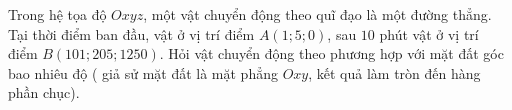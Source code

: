 \begin{ex}%
	Trong hệ tọa độ $Oxyz$, một vật chuyển động theo quĩ đạo là một đường thẳng. Tại thời điểm ban đầu, vật ở vị trí điểm $A(1;5;0)$, sau $10$ phút vật ở vị trí điểm $B(101;205;1250)$. Hỏi vật chuyển động theo phương hợp với mặt đất góc bao nhiêu độ ( giả sử mặt đất là mặt phẳng $Oxy$, kết quả làm tròn đến hàng phần chục).\\
\end{ex}

